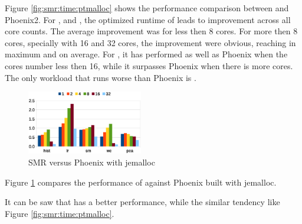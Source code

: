 Figure \ref{fig:smr:time:ptmalloc} shows the performance comparison between \myds and Phoenix2.
For ,  and , the optimized runtime of \myds leads to improvement across all core counts.
The average improvement was  for less then 8 cores.
For more then 8 cores, specially with 16 and 32 cores, the improvement were obvious, reaching  in maximum and  on average.
For , it has performed as well as Phoenix when the cores number less then 16, while it surpasses Phoenix when there is more cores.
The only workload that \myds runs worse than Phoenix is .
\begin{figure}[!h!t]  
	\centering
	\includegraphics[width=0.45\textwidth]{eps/dmr_time_jemalloc.eps}
	\caption{SMR versus Phoenix with jemalloc}
	\label{fig:smr:time:jemalloc}
\end{figure}
Figure \ref{fig:smr:time:jemalloc} compares the performance of \myds against Phoenix built with jemalloc. 

It can be saw that  has a better performance, while the similar tendency like Figure \ref{fig:smr:time:ptmalloc}.


